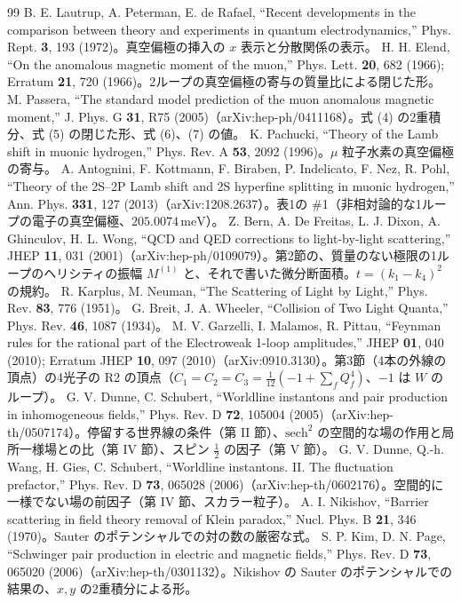 \documentclass[a4paper,10pt]{ltjsarticle}
\begin{document}
\begin{thebibliography}{99}
 B. E. Lautrup, A. Peterman, E. de Rafael, ``Recent developments in the comparison between theory and experiments in quantum electrodynamics,'' Phys. Rept. \textbf{3}, 193 (1972)。真空偏極の挿入の $x$ 表示と分散関係の表示。
 H. H. Elend, ``On the anomalous magnetic moment of the muon,'' Phys. Lett. \textbf{20}, 682 (1966); Erratum \textbf{21}, 720 (1966)。2ループの真空偏極の寄与の質量比による閉じた形。
 M. Passera, ``The standard model prediction of the muon anomalous magnetic moment,'' J. Phys. G \textbf{31}, R75 (2005)（arXiv:hep-ph/0411168）。式 (4) の2重積分、式 (5) の閉じた形、式 (6)、(7) の値。
 K. Pachucki, ``Theory of the Lamb shift in muonic hydrogen,'' Phys. Rev. A \textbf{53}, 2092 (1996)。$\mu$ 粒子水素の真空偏極の寄与。
 A. Antognini, F. Kottmann, F. Biraben, P. Indelicato, F. Nez, R. Pohl, ``Theory of the 2S--2P Lamb shift and 2S hyperfine splitting in muonic hydrogen,'' Ann. Phys. \textbf{331}, 127 (2013)（arXiv:1208.2637）。表1の \#1（非相対論的な1ループの電子の真空偏極、$205.0074\,\mathrm{meV}$）。
 Z. Bern, A. De Freitas, L. J. Dixon, A. Ghinculov, H. L. Wong, ``QCD and QED corrections to light-by-light scattering,'' JHEP \textbf{11}, 031 (2001)（arXiv:hep-ph/0109079）。第2節の、質量のない極限の1ループのヘリシティの振幅 $M^{(1)}$ と、それで書いた微分断面積。$t=(k_1-k_4)^2$ の規約。
 R. Karplus, M. Neuman, ``The Scattering of Light by Light,'' Phys. Rev. \textbf{83}, 776 (1951)。
 G. Breit, J. A. Wheeler, ``Collision of Two Light Quanta,'' Phys. Rev. \textbf{46}, 1087 (1934)。
 M. V. Garzelli, I. Malamos, R. Pittau, ``Feynman rules for the rational part of the Electroweak 1-loop amplitudes,'' JHEP \textbf{01}, 040 (2010); Erratum JHEP \textbf{10}, 097 (2010)（arXiv:0910.3130）。第3節（4本の外線の頂点）の4光子の R2 の頂点（$C_1=C_2=C_3=\frac1{12}(-1+\sum_fQ_f^4)$、$-1$ は $W$ のループ）。
 G. V. Dunne, C. Schubert, ``Worldline instantons and pair production in inhomogeneous fields,'' Phys. Rev. D \textbf{72}, 105004 (2005)（arXiv:hep-th/0507174）。停留する世界線の条件（第 II 節）、$\mathrm{sech}^2$ の空間的な場の作用と局所一様場との比（第 IV 節）、スピン $\frac12$ の因子（第 V 節）。
 G. V. Dunne, Q.-h. Wang, H. Gies, C. Schubert, ``Worldline instantons. II. The fluctuation prefactor,'' Phys. Rev. D \textbf{73}, 065028 (2006)（arXiv:hep-th/0602176）。空間的に一様でない場の前因子（第 IV 節、スカラー粒子）。
 A. I. Nikishov, ``Barrier scattering in field theory removal of Klein paradox,'' Nucl. Phys. B \textbf{21}, 346 (1970)。Sauter のポテンシャルでの対の数の厳密な式。
 S. P. Kim, D. N. Page, ``Schwinger pair production in electric and magnetic fields,'' Phys. Rev. D \textbf{73}, 065020 (2006)（arXiv:hep-th/0301132）。Nikishov の Sauter のポテンシャルでの結果の、$x,y$ の2重積分による形。
\end{thebibliography}
\end{document}
